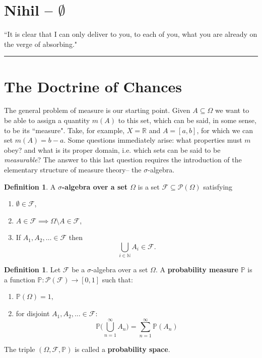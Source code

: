 \documentclass[reqno,a4paper,12pt]{amsart}%
\numberwithin{equation}{section}
\theoremstyle{definition}
\newtheorem{definition}[theorem]{Definition}
\newcommand{\Pp}{{\mathbb{P}}}
\newcommand {\RR}{\mathbb{R}}
\newcommand {\NN}{\mathbb{N}}
\begin{document}
\vfil
\fi


\pagebreak	

\tableofcontents

\section*{Nihil -- $\emptyset$}
	
\begin{quoting}
``It is clear that I can only deliver to you, to each of you, what you are already on the verge of absorbing."  
\end{quoting}

\begin{center}
\par\noindent\rule{200pt}{0.1pt}
\end{center}
		
\section{The Doctrine of Chances} 

The general problem of measure is our starting point. Given $A \subseteq \Omega$ we want to be able to assign a quantity $m(A)$ to this set, which can be said, in some sense, to be its ``measure". Take, for example, $X=\RR$  and $A = [a,b]$, for which we can set $m (A)  = b-a$. Some questions immediately arise: what properties must $m$ obey? and what is its proper domain, i.e. which sets can be said to be \textit{measurable}? The answer to this last question requires the introduction of the elementary structure of measure theory-- the $\sigma$-algebra.
\begin{definition}
	A  \textbf{$\sigma$-algebra over a set $\Omega$} is a set $\mathcal{F} \subseteq \mathcal{P}(\Omega)$ satisfying
	\begin{enumerate}
		\item $\emptyset \in \mathcal{F}$,
		\item $A \in \mathcal{F} \implies \Omega \setminus A \in \mathcal{F}$,
		\item If $A_1, A_2, \ldots \in \mathcal{F}$ then
		\[
		\bigcup_{i \in \NN} A_i \in \mathcal{F}.
		\]
	\end{enumerate}
\end{definition}
	
\begin{definition}
	Let $\mathcal{F}$ be a $\sigma$-algebra over a set $\Omega$. A \textbf{probability measure} $\Pp$ is a  function $\Pp: \mathcal{P}(\mathcal{F}) \rightarrow [0,1] $ such that:
\begin{enumerate}
	\item $\Pp (\Omega) =1,$
	\item  for disjoint $A_1, A_2,... \in \mathcal{F}:$ $$\Pp \Bigg( \bigcup^{\infty}_{n=1} A_n \Bigg) = \sum^{\infty}_{n=1} \Pp (A_n) $$
\end{enumerate}
 The triple $(\Omega, \mathcal{F}, \Pp)$ is called a \textbf{probability space}.
\end{definition}
\end{document}
